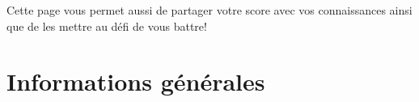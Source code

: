 \documentclass[11pt]{scrreprt}
\begin{document}
    Cette page vous permet aussi de partager votre score avec vos connaissances ainsi que de les mettre au défi de vous battre!

    \section{Informations générales}
    \begin{figure}[H]
        \centering
        \mbox{\quad\quad\quad
}
\end{figure}
\end{document}
